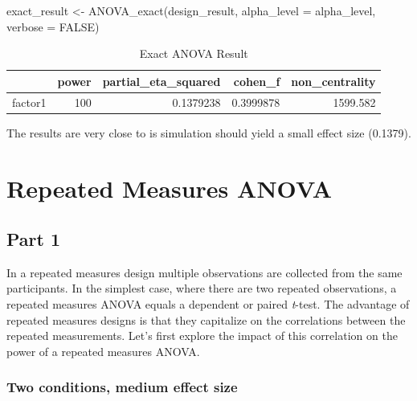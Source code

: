 \documentclass[
]{book}
\newenvironment{Shaded}{\begin{snugshade}}{\end{snugshade}}
\newcommand{\AttributeTok}[1]{\textcolor[rgb]{0.77,0.63,0.00}{#1}}
\newcommand{\ConstantTok}[1]{\textcolor[rgb]{0.00,0.00,0.00}{#1}}
\newcommand{\FunctionTok}[1]{\textcolor[rgb]{0.00,0.00,0.00}{#1}}
\newcommand{\NormalTok}[1]{#1}
\newcommand{\OtherTok}[1]{\textcolor[rgb]{0.56,0.35,0.01}{#1}}
\begin{document}
\begin{Shaded}
\begin{Highlighting}[]
\NormalTok{exact\_result }\OtherTok{\textless{}{-}} \FunctionTok{ANOVA\_exact}\NormalTok{(design\_result,}
                            \AttributeTok{alpha\_level =}\NormalTok{ alpha\_level,}
                            \AttributeTok{verbose =} \ConstantTok{FALSE}\NormalTok{)}
\end{Highlighting}
\end{Shaded}

\begin{table}[!h]

\caption{\label{tab:unnamed-chunk-86}Exact ANOVA Result}
\centering
\begin{tabular}[t]{l|r|r|r|r}
\hline
  & power & partial\_eta\_squared & cohen\_f & non\_centrality\\
\hline
factor1 & 100 & 0.1379238 & 0.3999878 & 1599.582\\
\hline
\end{tabular}
\end{table}

The results are very close to is simulation should yield a small effect size (0.1379).

\hypertarget{repeated-measures-anova}{%
\chapter{Repeated Measures ANOVA}\label{repeated-measures-anova}}

\hypertarget{part-1}{%
\section{Part 1}\label{part-1}}

In a repeated measures design multiple observations are collected from the same participants. In the simplest case, where there are two repeated observations, a repeated measures ANOVA equals a dependent or paired \emph{t}-test. The advantage of repeated measures designs is that they capitalize on the correlations between the repeated measurements. Let's first explore the impact of this correlation on the power of a repeated measures ANOVA.

\hypertarget{two-conditions-medium-effect-size}{%
\subsection{Two conditions, medium effect size}\label{two-conditions-medium-effect-size}}
\end{document}

